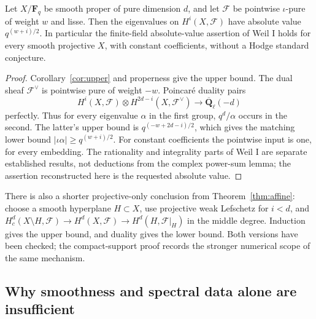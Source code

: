\begin{corollary}
\label{cor:purity}
Let $X/\mathbf F_q$ be smooth proper of pure dimension $d$, and let
$\mathcal F$ be pointwise $\iota$-pure of weight $w$ and lisse.
Then the eigenvalues on $H^i(X,\mathcal F)$ have absolute value
$q^{(w+i)/2}$.  In particular the finite-field absolute-value assertion
of Weil I holds for every smooth projective $X$, with constant
coefficients, without a Hodge standard conjecture.
\end{corollary}
\begin{proof}
Corollary~\ref{cor:upper} and properness give the upper bound.
The dual sheaf $\mathcal F^\vee$ is pointwise pure of weight $-w$.
Poincar\'e duality pairs
\[
 H^i(X,\mathcal F)\otimes
 H^{2d-i}(X,\mathcal F^\vee)\longrightarrow
                         \overline{\mathbf Q}_\ell(-d)
\]
perfectly.  Thus for every eigenvalue $\alpha$ in the first group,
$q^d/\alpha$ occurs in the second.  The latter's upper bound is
$q^{(-w+2d-i)/2}$, which gives the matching lower bound
$|\iota\alpha|\ge q^{(w+i)/2}$.
For constant coefficients the pointwise input is one, for every
embedding.  The rationality and integrality parts of Weil I are
separate established results, not deductions from the complex power-sum
lemma; the assertion reconstructed here is the requested absolute value.
\end{proof}

There is also a shorter projective-only conclusion from
Theorem~\ref{thm:affine}: choose a smooth hyperplane $H\subset X$,
use projective weak Lefschetz for $i<d$, and
$H_c^d(X\setminus H,\mathcal F)\to H^d(X,\mathcal F)\to
H^d(H,\mathcal F|_H)$ in the middle degree.  Induction gives the upper
bound, and duality gives the lower bound.  Both versions have been
checked; the compact-support proof records the stronger numerical scope
of the same mechanism.

\subsection{Why smoothness and spectral data alone are insufficient}

